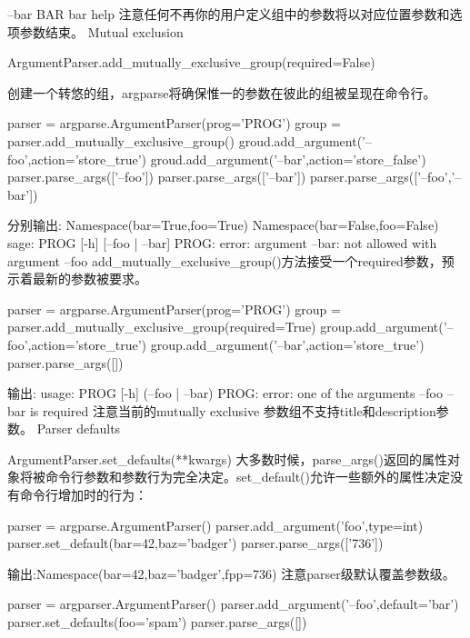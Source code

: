   --bar BAR  bar help\newline
注意任何不再你的用户定义组中的参数将以对应位置参数和选项参数结束。
Mutual exclusion\par
ArgumentParser.add\_mutually\_exclusive\_group(required=False)\par
创建一个转悠的组，argparse将确保惟一的参数在彼此的组被呈现在命令行。
\begin{python}
parser = argparse.ArgumentParser(prog='PROG')
group = parser.add_mutually_exclusive_group()
groud.add_argument('--foo',action='store_true')
groud.add_argument('--bar',action='store_false')
parser.parse_args(['--foo'])
parser.parse_args(['--bar'])
parser.parse_args(['--foo','--bar'])
\end{python}
分别输出:\newline
Namespace(bar=True,foo=True)\newline
Namespace(bar=False,foo=False)\newline
sage: PROG [-h] [--foo | --bar]\newline
PROG: error: argument --bar: not allowed with argument --foo\newline
add\_mutually\_exclusive\_group()方法接受一个required参数，预示着最新的参数被要求。
\begin{python}
parser = argparse.ArgumentParser(prog='PROG')
group = parser.add_mutually_exclusive_group(required=True)
group.add_argument('--foo',action='store_true')
group.add_argument('--bar',action='store_true')
parser.parse_args([])
\end{python}
输出:\newline
usage: PROG [-h] (--foo | --bar)\newline
PROG: error: one of the arguments --foo --bar is required\newline
注意当前的mutually exclusive 参数组不支持title和description参数。
Parser defaults\par
ArgumentParser.set\_defaults(**kwargs)\newline
大多数时候，parse\_args()返回的属性对象将被命令行参数和参数行为完全决定。set\_default()允许一些额外的属性决定没有命令行增加时的行为：
\begin{python}
parser = argparse.ArgumentParser()
parser.add_argument('foo',type=int)
parser.set_default(bar=42,baz='badger')
parser.parse_args(['736'])
\end{python}
输出:Namespace(bar=42,baz='badger',fpp=736)
注意parser级默认覆盖参数级。
\begin{python}
parser = argparser.ArgumentParser()
parser.add_argument('--foo',default='bar')
parser.set_defaults(foo='spam')
parser.parse_args([])
\end{python}
